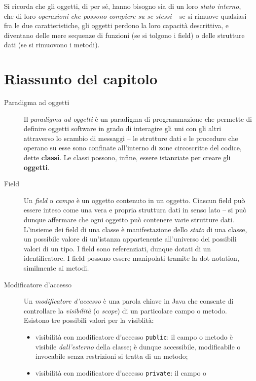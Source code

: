 \documentclass[\fontsizeclass,twocolumn]{\classname}
\theoremstyle{definition}
\theoremstyle{definition}
\begin{document}
Si ricorda che gli oggetti, di per sé, hanno bisogno sia di un loro \emph{stato
interno}, che di loro \emph{operazioni che possono compiere su se stessi} \---
se si rimuove qualsiasi fra le due caratteristiche, gli oggetti perdono la loro
capacità descrittiva, e diventano delle mere sequenze di funzioni (se si
tolgono i field) o delle strutture dati (se si rimuovono i metodi).

\section{Riassunto del capitolo}
\begin{description}
    \item[Paradigma ad oggetti] Il \emph{paradigma ad oggetti} è un paradigma
        di programmazione che permette di definire oggetti software in grado di
        interagire gli uni con gli altri attraverso lo scambio di messaggi \---
        le strutture dati e le procedure che operano su esse sono confinate
        all'interno di zone circoscritte del codice, dette \textbf{classi}. Le
        classi possono, infine, essere istanziate per creare gli
        \textbf{oggetti}.
    \item[Field] Un \emph{field} o \emph{campo} è un oggetto contenuto in un
        oggetto. Ciascun field può essere inteso come una vera e propria
        struttura dati in senso lato \--- si può dunque affermare che ogni
        oggetto può contenere varie strutture dati. L'insieme dei field di una
        classe è manifestazione dello \emph{stato} di una classe, un possibile
        valore di un'istanza appartenente all'universo dei possibili valori di
        un tipo. I field sono referenziati, dunque dotati di un identificatore.
        I field possono essere manipolati tramite la dot notation, similmente
        ai metodi.
    \item[Modificatore d'accesso] Un \emph{modificatore d'accesso} è una parola chiave in Java che consente di controllare la \emph{visibilità} (o \emph{scope}) di un particolare campo o metodo. Esistono tre possibili valori per la visiblità:
\begin{itemize}
    \item visibilità con modificatore d'accesso \texttt{public}: il campo o
        metodo è visibile \emph{dall'esterno} della classe; è dunque
        accessibile, modificabile o invocabile senza restrizioni si tratta di
        un metodo;
    \item visibilità con modificatore d'accesso \texttt{private}: il campo o

\end{itemize}
\end{description}
\end{document}
